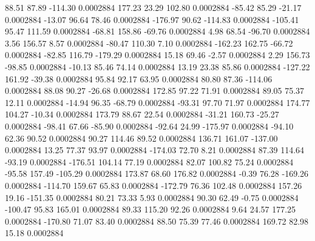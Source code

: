        88.51       87.89     -114.30     0.0002884
      177.23       23.29      102.80     0.0002884
      -85.42       85.29      -21.17     0.0002884
      -13.07       96.64       78.46     0.0002884
     -176.97       90.62     -114.83     0.0002884
     -105.41       95.47      111.59     0.0002884
      -68.81      158.86      -69.76     0.0002884
        4.98       68.54      -96.70     0.0002884
        3.56      156.57        8.57     0.0002884
      -80.47      110.30        7.10     0.0002884
     -162.23      162.75      -66.72     0.0002884
      -82.85      116.79     -179.29     0.0002884
       15.18       69.46       -2.57     0.0002884
        2.29      156.73      -98.85     0.0002884
      -10.13       85.46       74.14     0.0002884
       13.19       23.38       85.86     0.0002884
     -127.22      161.92      -39.38     0.0002884
       95.84       92.17       63.95     0.0002884
       80.80       87.36     -114.06     0.0002884
       88.08       90.27      -26.68     0.0002884
      172.85       97.22       71.91     0.0002884
       89.05       75.37       12.11     0.0002884
      -14.94       96.35      -68.79     0.0002884
      -93.31       97.70       71.97     0.0002884
      174.77      104.27      -10.34     0.0002884
      173.79       88.67       22.54     0.0002884
      -31.21      160.73      -25.27     0.0002884
      -98.41       67.66      -85.90     0.0002884
      -92.64       24.99     -175.97     0.0002884
      -94.10       62.36       90.52     0.0002884
       90.27      114.46       89.52     0.0002884
      136.71      161.07     -137.00     0.0002884
       13.25       77.37       93.97     0.0002884
     -174.03       72.70        8.21     0.0002884
       87.39      114.64      -93.19     0.0002884
     -176.51      104.14       77.19     0.0002884
       82.07      100.82       75.24     0.0002884
      -95.58      157.49     -105.29     0.0002884
      173.87       68.60      176.82     0.0002884
       -0.39       76.28     -169.26     0.0002884
     -114.70      159.67       65.83     0.0002884
     -172.79       76.36      102.48     0.0002884
      157.26       19.16     -151.35     0.0002884
       80.21       73.33        5.93     0.0002884
       90.30       62.49       -0.75     0.0002884
     -100.47       95.83      165.01     0.0002884
       89.33      115.20       92.26     0.0002884
        9.64       24.57      177.25     0.0002884
     -170.80       71.07       83.40     0.0002884
       88.50       75.39       77.46     0.0002884
      169.72       82.98       15.18     0.0002884
